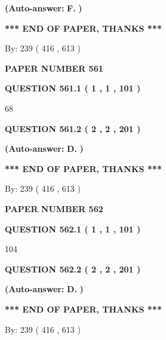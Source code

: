 \documentclass[12pt]{article}
\begin{document}
 
{\textbf{(Auto-answer:}}
{\textbf{\large{
F.}}}
{\textbf{)}}
 
 
   
   
   
   
\vspace{1.0in} 
{\textbf{\large{ *** END OF PAPER, THANKS *** }}} 
   
   
\hspace{1.0in} By: 
 239 ( 416 ,  613 )
   
   
   
   
\newpage 
\setcounter{page}{ 
   561001 } 
   
   
 {\textbf{ \Large{ PAPER NUMBER  561  }}}
   
   
   
   
  
  
{\textbf{\large{QUESTION
561.1 
 ( 1 , 1 , 101 )
}}}

68
  
  
{\textbf{\large{QUESTION
561.2 
 ( 2 , 2 , 201 )
}}}
 
 
{\textbf{(Auto-answer:}}
{\textbf{\large{
D.}}}
{\textbf{)}}
 
 
   
   
   
   
\vspace{1.0in} 
{\textbf{\large{ *** END OF PAPER, THANKS *** }}} 
   
   
\hspace{1.0in} By: 
 239 ( 416 ,  613 )
   
   
   
   
\newpage 
\setcounter{page}{ 
   562001 } 
   
   
 {\textbf{ \Large{ PAPER NUMBER  562  }}}
   
   
   
   
  
  
{\textbf{\large{QUESTION
562.1 
 ( 1 , 1 , 101 )
}}}

104
  
  
{\textbf{\large{QUESTION
562.2 
 ( 2 , 2 , 201 )
}}}
 
 
{\textbf{(Auto-answer:}}
{\textbf{\large{
D.}}}
{\textbf{)}}
 
 
   
   
   
   
\vspace{1.0in} 
{\textbf{\large{ *** END OF PAPER, THANKS *** }}} 
   
   
\hspace{1.0in} By: 
 239 ( 416 ,  613 )
   
   
   
\end{document}
